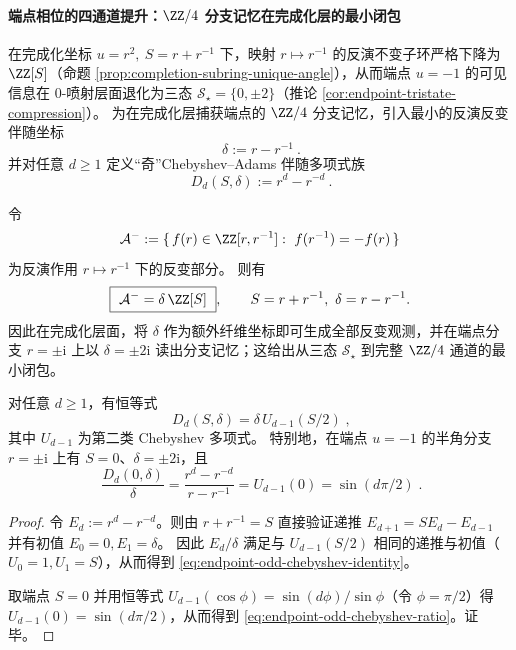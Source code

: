 \paragraph{端点相位的四通道提升：\texorpdfstring{$\ZZ/4$}{Z/4} 分支记忆在完成化层的最小闭包}
在完成化坐标 \(u=r^{2},\ S=r+r^{-1}\) 下，映射 \(r\mapsto r^{-1}\) 的反演不变子环严格下降为 \(\ZZ[S]\)（命题 \ref{prop:completion-subring-unique-angle}），从而端点 \(u=-1\) 的可见信息在 \(0\)-喷射层面退化为三态 \(\mathcal S_\star=\{0,\pm 2\}\)（推论 \ref{cor:endpoint-tristate-compression}）。
为在完成化层捕获端点的 \(\ZZ/4\) 分支记忆，引入最小的反演反变伴随坐标
\begin{equation}\label{eq:endpoint-delta-anti-invariant}
\boxed{\ \delta:=r-r^{-1}\ }.
\end{equation}
并对任意 \(d\ge 1\) 定义“奇”Chebyshev--Adams 伴随多项式族
\begin{equation}\label{eq:endpoint-odd-chebyshev-adams}
\boxed{\ D_d(S,\delta):=r^{d}-r^{-d}\ }.
\end{equation}

\begin{remark}[反演反变扇区的主生成元与最小闭包]\label{rem:endpoint-inv-antiinv-min-closure}
令
\[
\mathcal A^{-}:=\{\,f(r)\in \ZZ[r,r^{-1}]:\ f(r^{-1})=-f(r)\,\}
\]
为反演作用 \(r\mapsto r^{-1}\) 下的反变部分。
则有
\[
\boxed{\ \mathcal A^{-}=\delta\,\ZZ[S]\ },\qquad S=r+r^{-1},\ \delta=r-r^{-1}.
\]
因此在完成化层面，将 \(\delta\) 作为额外纤维坐标即可生成全部反变观测，并在端点分支 \(r=\pm\mathrm{i}\) 上以 \(\delta=\pm 2\mathrm{i}\) 读出分支记忆；这给出从三态 \(\mathcal S_\star\) 到完整 \(\ZZ/4\) 通道的最小闭包。
\end{remark}

\begin{proposition}\label{prop:endpoint-odd-chebyshev-identity}
对任意 \(d\ge 1\)，有恒等式
\begin{equation}\label{eq:endpoint-odd-chebyshev-identity}
\boxed{\;
D_d(S,\delta)=\delta\,U_{d-1}(S/2)\; },
\end{equation}
其中 \(U_{d-1}\) 为第二类 Chebyshev 多项式。
特别地，在端点 \(u=-1\) 的半角分支 \(r=\pm\mathrm{i}\) 上有 \(S=0\)、\(\delta=\pm 2\mathrm{i}\)，且
\begin{equation}\label{eq:endpoint-odd-chebyshev-ratio}
\boxed{\;
\frac{D_d(0,\delta)}{\delta}
=\frac{r^{d}-r^{-d}}{r-r^{-1}}
=U_{d-1}(0)
=\sin(d\pi/2)\; }.
\end{equation}
\end{proposition}
\begin{proof}
令 \(E_d:=r^{d}-r^{-d}\)。则由 \(r+r^{-1}=S\) 直接验证递推
\(
E_{d+1}=SE_d-E_{d-1}
\)
并有初值 \(E_0=0,E_1=\delta\)。
因此 \(E_d/\delta\) 满足与 \(U_{d-1}(S/2)\) 相同的递推与初值（\(U_0=1,U_1=S\)），从而得到 \eqref{eq:endpoint-odd-chebyshev-identity}。
\par
取端点 \(S=0\) 并用恒等式 \(U_{d-1}(\cos\phi)=\sin(d\phi)/\sin\phi\)（令 \(\phi=\pi/2\)）得 \(U_{d-1}(0)=\sin(d\pi/2)\)，从而得到 \eqref{eq:endpoint-odd-chebyshev-ratio}。证毕。
\end{proof}

